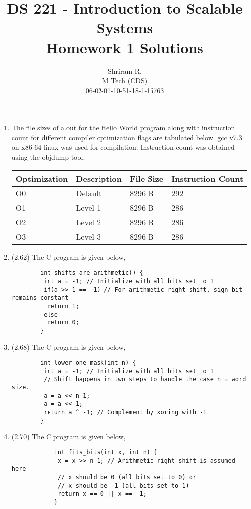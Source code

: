 \documentclass[11pt,a4paper,oneside]{article}
\begin{document}
	\title{DS 221 - Introduction to Scalable Systems \\ Homework 1 Solutions}
	\author{Shriram R. \\ M Tech (CDS) \\ 06-02-01-10-51-18-1-15763}
	\maketitle
	\begin{enumerate}{}{}
		\item The file sizes of a.out for the Hello World program along with instruction count for different compiler optimization flags are tabulated below. gcc v7.3 on x86-64 linux was used for compilation. Instruction count was obtained using the objdump tool.
		\begin{center}
			\begin{tabular}{|l|l|l|l|}
				\hline
				Optimization & Description & File Size &  Instruction Count\\
				\hline
				O0 & Default & 8296 B & 292 \\
				O1 & Level 1 & 8296 B & 286 \\
				O2 & Level 2 & 8296 B & 286 \\
				O3 & Level 3 & 8296 B & 286 \\				
				\hline
			\end{tabular}
		\end{center}
		\item (2.62) The C program is given below,
		\begin{verbatim}
		int shifts_are_arithmetic() {
		 int a = -1; // Initialize with all bits set to 1		 
		 if(a >> 1 == -1) // For arithmetic right shift, sign bit remains constant
		  return 1;
		 else
		  return 0;
		}
		\end{verbatim}
		\item (2.68) The C program is given below,
		\begin{verbatim}
		int lower_one_mask(int n) {
		 int a = -1; // Initialize with all bits set to 1		 
		 // Shift happens in two steps to handle the case n = word size.
		 a = a << n-1;
		 a = a << 1;		 
		 return a ^ -1; // Complement by xoring with -1
		}
		\end{verbatim}	
		\item (2.70) The C program is given below,
		\begin{verbatim}
			int fits_bits(int x, int n) {
			 x = x >> n-1; // Arithmetic right shift is assumed here			 
			 // x should be 0 (all bits set to 0) or
			 // x should be -1 (all bits set to 1)			 
			 return x == 0 || x == -1;		
			}
		\end{verbatim}	
	\end{enumerate}
	
\end{document}
